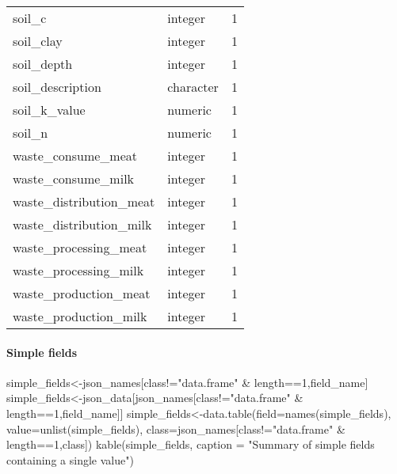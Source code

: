 \documentclass[
]{article}
\newenvironment{Shaded}{\begin{snugshade}}{\end{snugshade}}
\newcommand{\AttributeTok}[1]{\textcolor[rgb]{0.77,0.63,0.00}{#1}}
\newcommand{\DecValTok}[1]{\textcolor[rgb]{0.00,0.00,0.81}{#1}}
\newcommand{\FunctionTok}[1]{\textcolor[rgb]{0.00,0.00,0.00}{#1}}
\newcommand{\NormalTok}[1]{#1}
\newcommand{\OtherTok}[1]{\textcolor[rgb]{0.56,0.35,0.01}{#1}}
\newcommand{\SpecialCharTok}[1]{\textcolor[rgb]{0.00,0.00,0.00}{#1}}
\newcommand{\StringTok}[1]{\textcolor[rgb]{0.31,0.60,0.02}{#1}}
\begin{document}
\begin{longtable}[]{@{}llr@{}}
soil\_c & integer & 1 \\
soil\_clay & integer & 1 \\
soil\_depth & integer & 1 \\
soil\_description & character & 1 \\
soil\_k\_value & numeric & 1 \\
soil\_n & numeric & 1 \\
waste\_consume\_meat & integer & 1 \\
waste\_consume\_milk & integer & 1 \\
waste\_distribution\_meat & integer & 1 \\
waste\_distribution\_milk & integer & 1 \\
waste\_processing\_meat & integer & 1 \\
waste\_processing\_milk & integer & 1 \\
waste\_production\_meat & integer & 1 \\
waste\_production\_milk & integer & 1 \\
\bottomrule()
\end{longtable}

\hypertarget{simple-fields}{%
\paragraph{Simple fields}\label{simple-fields}}

\begin{Shaded}
\begin{Highlighting}[]
\NormalTok{simple\_fields}\OtherTok{\textless{}{-}}\NormalTok{json\_names[class}\SpecialCharTok{!=}\StringTok{"data.frame"} \SpecialCharTok{\&}\NormalTok{ length}\SpecialCharTok{==}\DecValTok{1}\NormalTok{,field\_name]}
\NormalTok{simple\_fields}\OtherTok{\textless{}{-}}\NormalTok{json\_data[json\_names[class}\SpecialCharTok{!=}\StringTok{"data.frame"} \SpecialCharTok{\&}\NormalTok{ length}\SpecialCharTok{==}\DecValTok{1}\NormalTok{,field\_name]]}
\NormalTok{simple\_fields}\OtherTok{\textless{}{-}}\FunctionTok{data.table}\NormalTok{(}\AttributeTok{field=}\FunctionTok{names}\NormalTok{(simple\_fields),}
                          \AttributeTok{value=}\FunctionTok{unlist}\NormalTok{(simple\_fields),}
                          \AttributeTok{class=}\NormalTok{json\_names[class}\SpecialCharTok{!=}\StringTok{"data.frame"} \SpecialCharTok{\&}\NormalTok{ length}\SpecialCharTok{==}\DecValTok{1}\NormalTok{,class])}
\FunctionTok{kable}\NormalTok{(simple\_fields, }\AttributeTok{caption =} \StringTok{"Summary of simple fields containing a single value"}\NormalTok{)}
\end{Highlighting}
\end{Shaded}
\end{document}
